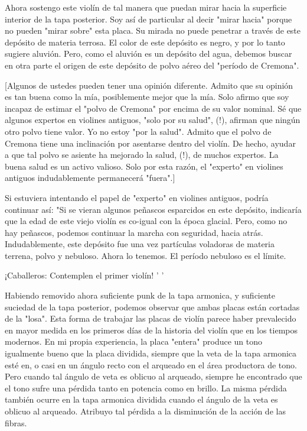 \documentclass[12pt]{book}
\begin{document}
Ahora sostengo este violín de tal manera que puedan mirar hacia la superficie interior de la tapa posterior. Soy así de particular al decir "mirar hacia" porque no pueden "mirar sobre" esta placa. Su mirada no puede penetrar a través de este depósito de materia terrosa. El color de este depósito es negro, y por lo tanto sugiere aluvión. Pero, como el aluvión es un depósito del agua, debemos buscar en otra parte el origen de este depósito de polvo aéreo del "período de Cremona".

[Algunos de ustedes pueden tener una opinión diferente. Admito que su opinión es tan buena como la mía, posiblemente mejor que la mía. Solo afirmo que soy incapaz de estimar el "polvo de Cremona" por encima de su valor nominal. Sé que algunos expertos en violines antiguos, "solo por su salud", (!), afirman que ningún otro polvo tiene valor. Yo no estoy "por la salud". Admito que el polvo de Cremona tiene una inclinación por asentarse dentro del violín. De hecho, ayudar a que tal polvo se asiente ha mejorado la salud, (!), de muchos expertos. La buena salud es un activo valioso. Solo por esta razón, el "experto" en violines antiguos indudablemente permanecerá "fuera".]

Si estuviera intentando el papel de "experto" en violines antiguos, podría continuar así: "Si se vieran algunos peñascos esparcidos en este depósito, indicaría que la edad de este viejo violín es co-igual con la época glacial. Pero, como no hay peñascos, podemos continuar la marcha con seguridad, hacia atrás. Indudablemente, este depósito fue una vez partículas voladoras de materia terrena, polvo y nebuloso. Ahora lo tenemos. El período nebuloso es el límite.

¡Caballeros: Contemplen el primer violín! ' '

Habiendo removido ahora suficiente punk de la tapa armonica, y suficiente suciedad de la tapa posterior, podemos observar que ambas placas están cortadas de la "losa". Esta forma de trabajar las placas de violín parece haber prevalecido en mayor medida en los primeros días de la historia del violín que en los tiempos modernos. En mi propia experiencia, la placa "entera" produce un tono igualmente bueno que la placa dividida, siempre que la veta de la tapa armonica esté en, o casi en un ángulo recto con el arqueado en el área productora de tono. Pero cuando tal ángulo de veta es oblicuo al arqueado, siempre he encontrado que el tono sufre una pérdida tanto en potencia como en brillo. La misma pérdida también ocurre en la tapa armonica dividida cuando el ángulo de la veta es oblicuo al arqueado. Atribuyo tal pérdida a la disminución de la acción de las fibras.
\end{document}
